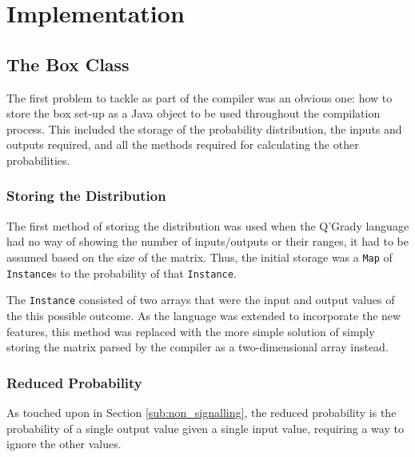 \documentclass[report.tex]{subfiles}
\begin{document}

\section{Implementation} %
\label{sec:implementation}
\subsection{The Box Class} %
\label{sub:the_box_class}
The first problem to tackle as part of the compiler was an obvious one: how to
store the box set-up as a Java object to be used throughout the compilation
process. This included the storage of the probability distribution, the inputs
and outputs required, and all the methods required for calculating the other
probabilities.

\subsubsection{Storing the Distribution} %
\label{ssub:storing_the_distribution}
The first method of storing the distribution was used when the Q'Grady language
had no way of showing the number of inputs/outputs or their ranges, it had to be
assumed based on the size of the matrix. Thus, the initial storage was a
\texttt{Map} of \texttt{Instance}s to the probability of that \texttt{Instance}.

The \texttt{Instance} consisted of two arrays that were the input and output
values of the this possible outcome. As the language was extended to incorporate
the new features, this method was replaced with the more simple solution of
simply storing the matrix parsed by the compiler as a two-dimensional array
instead.

\subsubsection{Reduced Probability} %
\label{ssub:reduced_probability}
As touched upon in Section \ref{sub:non_signalling}, the reduced probability is
the probability of a single output value given a single input value, requiring
a way to ignore the other values.

 
\end{document}
